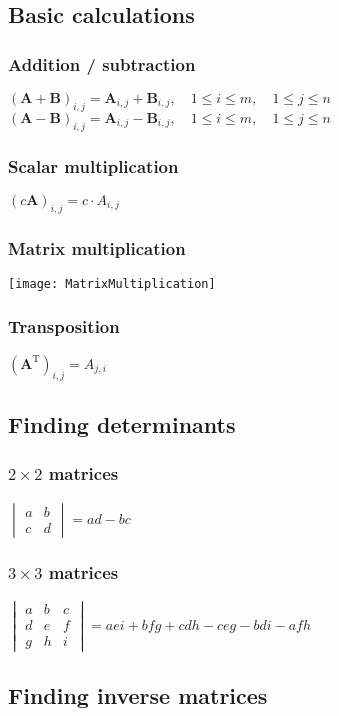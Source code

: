 \subsection{Basic calculations}
\subsubsection{Addition / subtraction}
$(\mathbf {A}+\mathbf {B})_{i,j}=\mathbf {A}_{i,j}+{\mathbf {B}}_{i,j},\quad 1\leq i\leq m,\quad 1\leq j\leq n$\\
$(\mathbf {A}-\mathbf {B})_{i,j}=\mathbf {A}_{i,j}-{\mathbf {B}}_{i,j},\quad 1\leq i\leq m,\quad 1\leq j\leq n$
\subsubsection{Scalar multiplication}
$(c\mathbf{A})_{i,j}=c\cdot A_{i,j}$
\subsubsection{Matrix multiplication}
\texttt{[image: MatrixMultiplication]}

\subsubsection{Transposition}
$(\mathbf{A}^\mathrm{T})_{i,j}=A_{j,i}$


\subsection{Finding determinants}

\subsubsection{$2\times2$ matrices}
$\begin{vmatrix}a&b\\c&d\end{vmatrix}=ad-bc$

\subsubsection{$3\times3$ matrices}

$\begin{vmatrix}a&b&c\\d&e&f\\g&h&i\end{vmatrix}=aei+bfg+cdh-ceg-bdi-afh$
\subsection{Finding inverse matrices}
